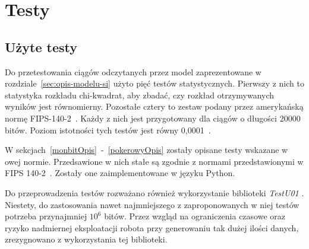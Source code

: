 \chapter{Testy}\label{ch:testy}


\section{Użyte testy}\label{testyOpis}

Do przetestowania ciągów odczytanych przez model zaprezentowane w rozdziale~\ref{sec:opis-modelu-si} użyto pięć
testów statystycznych. Pierwszy z nich to statystyka rozkładu chi-kwadrat, aby zbadać, czy rozkład otrzymywanych 
wyników jest równomierny. Pozostałe cztery to zestaw podany przez amerykańską normę FIPS-140-2~\cite{NIST2001}. Każdy z nich
jest przygotowany dla ciągów o długości 20000 bitów. Poziom istotności tych testów jest równy 0{,}0001~\cite{Kotulski2001}.


W sekcjach~\ref{monbitOpis}~-~\ref{pokerowyOpis} zostały opisane testy wskazane w owej normie. Przedsawione w nich stałe
są zgodnie z normami przedstawionymi w FIPS 140-2~\cite{NIST2001}. Zostały one zaimplementowane w języku Python.
\par
Do przeprowadzenia testów rozważano również wykorzystanie biblioteki \textit{TestU01} \cite{TestU01}. Niestety, do zastosowania nawet 
najmniejszego z zaproponowanych w niej testów potrzeba przynajmniej \begin{math} 10^6 \end{math} bitów. Przez 
wzgląd na ograniczenia czasowe oraz ryzyko nadmiernej eksploatacji robota przy generowaniu tak dużej ilości danych, 
zrezygnowano z wykorzystania tej biblioteki.



